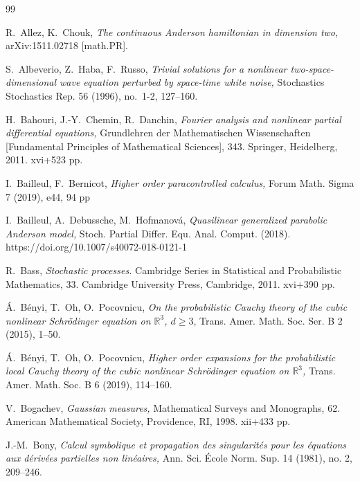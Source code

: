 \documentclass[%
11pt,  reqno]{amsart}
\newcommand{\1}{\hspace{0.2mm}\text{I}\hspace{0.2mm}}
\newcommand{\R}{\mathbb{R}}
\numberwithin{equation}{section}
\numberwithin{theorem}{section}
\begin{document}
\begin{thebibliography}{99}


R.~Allez, K.~Chouk,
{\it The continuous {Anderson} hamiltonian in dimension two,}
arXiv:1511.02718 [math.PR].



S.~Albeverio, Z.~Haba, F.~Russo, 
{\it Trivial solutions for a nonlinear two-space-dimensional wave equation perturbed by space-time white noise,} Stochastics Stochastics Rep.  56 (1996), no.~1-2, 127--160. 

H.~Bahouri, J.-Y.~Chemin, 
R.~Danchin, 
{\it Fourier analysis and nonlinear partial differential equations,}
Grundlehren der Mathematischen Wissenschaften [Fundamental Principles of Mathematical Sciences], 
343. Springer, Heidelberg, 2011. xvi+523 pp. 

I.~Bailleul,  F.~Bernicot,
{\it Higher order paracontrolled calculus,}
 Forum Math. Sigma 7 (2019), e44, 94 pp


I.~Bailleul, A.~Debussche,  M.~Hofmanov\'a,
{\it Quasilinear generalized parabolic {Anderson} model,}
 Stoch. Partial Differ. Equ. Anal. Comput. (2018). 
 https://doi.org/10.1007/s40072-018-0121-1


R.~Bass, 
{\it Stochastic processes.}
Cambridge Series in Statistical and Probabilistic Mathematics, 33. Cambridge University Press, Cambridge, 2011. xvi+390 pp. 




\'A.~B\'enyi, T.~Oh, O.~Pocovnicu,
{\it On the probabilistic Cauchy theory of the cubic nonlinear Schr\"odinger equation on 
$\R^3$, $d\geq 3$}, Trans. Amer. Math. Soc. Ser. B  2 (2015), 1--50. 


\'A.~B\'enyi, T.~Oh, O.~Pocovnicu,
{\it Higher order expansions for the probabilistic local Cauchy theory of the cubic nonlinear Schr\"odinger equation on $\R^3$,}
 Trans. Amer. Math. Soc.
 B 6 (2019), 114--160. 



V.~Bogachev, 
{\it Gaussian measures,}
 Mathematical Surveys and Monographs, 62. American Mathematical Society, Providence, RI, 1998. xii+433 pp.


J.-M.~Bony, 
{\it Calcul symbolique et propagation des singularit\'es pour les \'equations aux d\'eriv\'ees partielles non lin\'eaires,}
Ann. Sci. \'Ecole Norm. Sup.  14 (1981), no. 2, 209--246.



\end{thebibliography}
\end{document}
